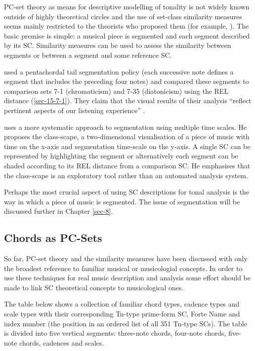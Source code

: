 \documentclass{article}
\begin{document}
PC-set theory as means for descriptive modelling of tonality is not
widely known outside of highly theoretical circles and the use of
set-class similarity measures seems mainly restricted to the theorists
who proposed them (for example, \citealt{Isaacson1996}). The basic
premise is simple: a musical piece is segmented and each segment
described by its SC. Similarity measures can be used to assess the
similarity between segments or between a segment and some reference
SC.

\citet{Huovinen2007} used a pentachordal tail segmentation policy
(each successive note defines a segment that includes the preceding
four notes) and compared these segments to comparison sets 7-1
(chromaticism) and 7-35 (diatonicism) using the REL distance
(\ref{sec-15-7-1}). They claim that the visual results of their analysis ``reflect
pertinent aspects of our listening experience''
\citep[pp. 204]{Huovinen}.

\citet[chap. 5.3]{Martorell2013} uses a more systematic approach to
segmentation using multiple time scales. He proposes the class-scape,
a two-dimensional visualisation of a piece of music with time on the
x-axis and segmentation time-scale on the y-axis. A single SC can be
represented by highlighting the segment or alternatively each segment
can be shaded according to its REL distance from a comparison SC. He
emphasises that the class-scape is an exploratory tool rather than an
automated analysis system.

Perhaps the most crucial aspect of using SC descriptions for tonal
analysis is the way in which a piece of music is segmented. The issue
of segmentation will be discussed further in Chapter \ref{sec-8}.
\subsection{Chords as PC-Sets}
\label{sec-3-7}

So far, PC-set theory and the similarity measures have been discussed
with only the broadest reference to familiar musical or musicologial
concepts. In order to use these techniques for real music description
and analysis some effort should be made to link SC theoretical
concepts to musicological ones.

The table below shows a collection of familiar chord types, cadence
types and scale types with their corresponding Tn-type prime-form SC,
Forte Name and index number (the position in an ordered list of all
351 Tn-type SCs). The table is divided into five vertical segments:
three-note chords, four-note chords, five-note chords, cadences and
scales.
\end{document}
